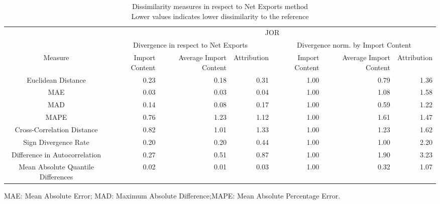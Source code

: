 \begin{table}[t]
\caption*{
{\large Dissimilarity measures in respect to Net Exports method} \\ 
{\small Lower values indicates lower dissimilarity to the reference}
} 
\fontsize{15.0pt}{18.0pt}\selectfont
\begin{tabular*}{\linewidth}{@{\extracolsep{\fill}}crrrrrr}
\toprule
 & \multicolumn{6}{c}{JOR} \\ 
\cmidrule(lr){2-7}
 & \multicolumn{3}{c}{Divergence in respect to Net Exports} & \multicolumn{3}{c}{Divergence norm. by Import Content} \\ 
\cmidrule(lr){2-4} \cmidrule(lr){5-7}
Measure & Import Content & Average Import Content & Attribution & Import Content & Average Import Content & Attribution \\ 
\midrule\addlinespace[2.5pt]
Euclidean Distance & 0.23 & 0.18 & 0.31 & 1.00 & 0.79 & 1.36 \\ 
MAE & 0.03 & 0.03 & 0.04 & 1.00 & 1.08 & 1.58 \\ 
MAD & 0.14 & 0.08 & 0.17 & 1.00 & 0.59 & 1.22 \\ 
MAPE & 0.76 & 1.23 & 1.12 & 1.00 & 1.61 & 1.47 \\ 
Cross-Correlation Distance & 0.82 & 1.01 & 1.33 & 1.00 & 1.23 & 1.62 \\ 
Sign Divergence Rate & 0.20 & 0.20 & 0.44 & 1.00 & 1.00 & 2.20 \\ 
Difference in Autocorrelation & 0.27 & 0.51 & 0.87 & 1.00 & 1.90 & 3.23 \\ 
Mean Absolute Quantile Differences & 0.02 & 0.01 & 0.03 & 1.00 & 0.32 & 1.07 \\ 
\bottomrule
\end{tabular*}
\begin{minipage}{\linewidth}
MAE: Mean Absolute Error; MAD: Maximum Absolute Difference;MAPE: Mean Absolute Percentage Error.\\
\end{minipage}
\end{table}

